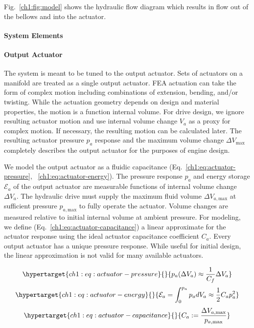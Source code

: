 Fig.~\ref{ch1:fig:model} shows the hydraulic flow diagram which results in
flow out of the bellows and into the actuator.

\hypertarget{ch1:system-elements}{%
\paragraph{System Elements}\label{ch1:system-elements}}

\hypertarget{ch1:output-actuator}{%
\paragraph{Output Actuator}\label{ch1:output-actuator}}

The system is meant to be tuned to the output actuator. Sets of
actuators on a manifold are treated as a single output actuator. \gls{FEA}
actuation can take the form of complex motion including combinations of
extension, bending, and/or twisting. While the actuation geometry
depends on design and material properties, the motion is a function
internal volume. For drive design, we ignore resulting actuator motion
and use internal volume change \(V_a\) as a proxy for complex motion. If
necessary, the resulting motion can be calculated later. The resulting
actuator pressure \(p_a\) response and the maximum volume change
\(\Delta V_\text{max}\) completely describes the output actuator for the
purposes of engine design.

We model the output actuator as a fluidic capacitance
(Eq.~\ref{ch1:eq:actuator-pressure}, ~\ref{ch1:eq:actuator-energy}).
The pressure response \(p_a\) and energy storage \(\mathcal{E}_a\) of the
output actuator are measurable functions of internal volume change \(\Delta V_a\). 
The hydraulic drive must supply the maximum fluid volume \(\Delta V_{a,\text{max}}\)
at sufficient pressure \(p_{a,\text{max}}\)
to fully operate the actuator. Volume changes are measured relative to
initial internal volume at ambient pressure.
For modeling, we define (Eq.~\ref{ch1:eq:actuator-capacitance}) a linear approximate for the
actuator response using the ideal actuator capacitance coefficient
\(C_a\). Every output actuator has a unique pressure response. While
useful for initial design, the linear approximation is not valid for
many available actuators.

\begin{equation}\protect\hypertarget{ch1:eq:actuator-pressure}{}{ 
p_a(\Delta V_a) 
\approx \frac{1}{C_f} \Delta V_a
}\label{ch1:eq:actuator-pressure}\end{equation}
\begin{equation}\protect\hypertarget{ch1:eq:actuator-energy}{}{ \mathcal{E}_a = \int_{0}^{p_a} p_a dV_a
\approx \frac{1}{2} C_a p_a^2 
}\label{ch1:eq:actuator-energy}\end{equation}
\begin{equation}\protect\hypertarget{ch1:eq:actuator-capacitance}{}{ C_a: = \frac{ \Delta V_{a,\text{max}} }{ p_{a,\text{max}} } 
}\label{ch1:eq:actuator-capacitance}\end{equation}


